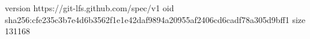 version https://git-lfs.github.com/spec/v1
oid sha256:cfe235c3b7e4d6b3562f1e1e42daf9894a20955af2406cd6cadf78a305d9bff1
size 131168
